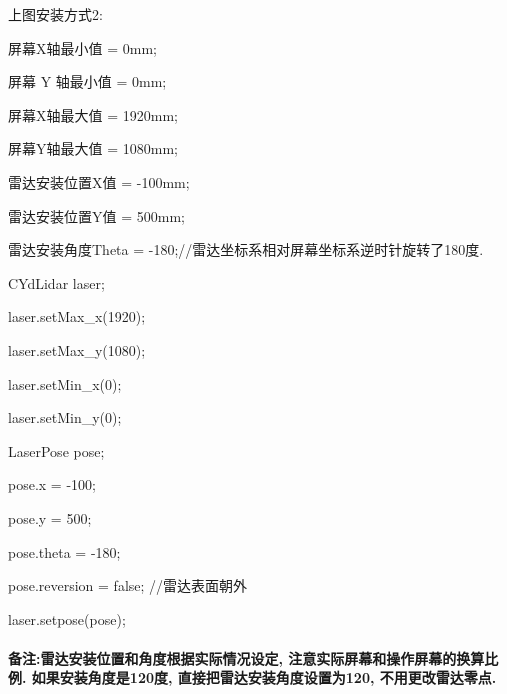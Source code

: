 上图安装方式2\+: \begin{DoxyVerb}屏幕X轴最小值 = 0mm;

屏幕 Y 轴最小值 = 0mm;

屏幕X轴最大值 = 1920mm;

屏幕Y轴最大值 = 1080mm;

雷达安装位置X值 = -100mm;

雷达安装位置Y值 = 500mm;

雷达安装角度Theta = -180;//雷达坐标系相对屏幕坐标系逆时针旋转了180度.

CYdLidar laser;

laser.setMax_x(1920);

laser.setMax_y(1080);

laser.setMin_x(0);

laser.setMin_y(0);

LaserPose pose;

pose.x = -100;

pose.y = 500;

pose.theta = -180;

pose.reversion = false; //雷达表面朝外

laser.setpose(pose);
\end{DoxyVerb}


\paragraph*{备注\+:雷达安装位置和角度根据实际情况设定, 注意实际屏幕和操作屏幕的换算比例. 如果安装角度是120度, 直接把雷达安装角度设置为120, 不用更改雷达零点.}